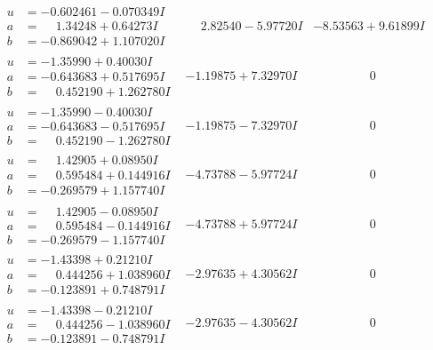 \documentclass[1p]{elsarticle_modified}
\theoremstyle{definition}
\begin{document}
$$\begin{array}{c|c|c}
\begin{aligned}
u &= -0.602461 - 0.070349 I \\
a &= \phantom{-}1.34248 + 0.64273 I \\
b &= -0.869042 + 1.107020 I\end{aligned}
 & \phantom{-}2.82540 - 5.97720 I & -8.53563 + 9.61899 I \\ \hline\begin{aligned}
u &= -1.35990 + 0.40030 I \\
a &= -0.643683 + 0.517695 I \\
b &= \phantom{-}0.452190 + 1.262780 I\end{aligned}
 & -1.19875 + 7.32970 I & \phantom{-0.000000 } 0 \\ \hline\begin{aligned}
u &= -1.35990 - 0.40030 I \\
a &= -0.643683 - 0.517695 I \\
b &= \phantom{-}0.452190 - 1.262780 I\end{aligned}
 & -1.19875 - 7.32970 I & \phantom{-0.000000 } 0 \\ \hline\begin{aligned}
u &= \phantom{-}1.42905 + 0.08950 I \\
a &= \phantom{-}0.595484 + 0.144916 I \\
b &= -0.269579 + 1.157740 I\end{aligned}
 & -4.73788 - 5.97724 I & \phantom{-0.000000 } 0 \\ \hline\begin{aligned}
u &= \phantom{-}1.42905 - 0.08950 I \\
a &= \phantom{-}0.595484 - 0.144916 I \\
b &= -0.269579 - 1.157740 I\end{aligned}
 & -4.73788 + 5.97724 I & \phantom{-0.000000 } 0 \\ \hline\begin{aligned}
u &= -1.43398 + 0.21210 I \\
a &= \phantom{-}0.444256 + 1.038960 I \\
b &= -0.123891 + 0.748791 I\end{aligned}
 & -2.97635 + 4.30562 I & \phantom{-0.000000 } 0 \\ \hline\begin{aligned}
u &= -1.43398 - 0.21210 I \\
a &= \phantom{-}0.444256 - 1.038960 I \\
b &= -0.123891 - 0.748791 I\end{aligned}
 & -2.97635 - 4.30562 I & \phantom{-0.000000 } 0 \\ \hline\begin{aligned}

\end{aligned}
\end{array}$$
\end{document}
